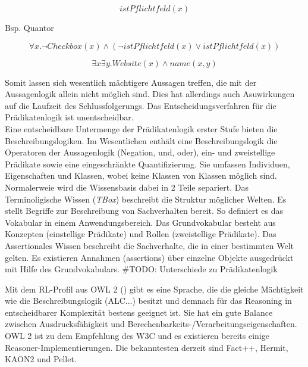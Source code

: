 \documentclass[runningheads,a4paper]{llncs}
\begin{document}
\begin{equation}
istPflichtfeld(x)
\end{equation}

Bsp. Quantor

\begin{equation}
\forall x. \neg Checkbox(x) \land (\neg istPflichtfeld(x) \lor istPflichtfeld(x))
\end{equation}

\begin{equation}
\exists x\exists y. Website(x) \land name(x, y)
\end{equation}

Somit lassen sich wesentlich mächtigere Aussagen treffen, die mit der Aussagenlogik allein nicht möglich sind.
Dies hat allerdings auch Asuwirkungen auf die Laufzeit des Schlussfolgerungs.
Das Entscheidungsverfahren für die Prädikatenlogik ist unentscheidbar. 
\\

Eine entscheidbare Untermenge der Prädikatenlogik erster Stufe bieten die Beschreibungslogiken.
Im Wesentlichen enthält eine Beschreibungslogik die Operatoren der Aussagenlogik (Negation, und, oder), ein- und zweistellige Prädikate sowie eine eingeschränkte Quantifizierung.
Sie umfassen Individuen, Eigenschaften und Klassen, wobei keine Klassen von Klassen möglich sind.
Normalerweie wird die Wissensbasis dabei in 2 Teile separiert. 
Das Terminoligische Wissen (\textit{TBox}) beschreibt die Struktur möglicher Welten. 
Es stellt Begriffe zur Beschreibung von Sachverhalten bereit. 
So definiert es das Vokabular in einem Anwendungsbereich. 
Das Grundvokabular besteht aus Konzepten (einstellige Prädikate) und Rollen (zweistellige Prädikate). 
Das Assertionales Wissen beschreibt die Sachverhalte, die in einer bestimmten Welt gelten. 
Es existieren Annahmen (assertions) über einzelne Objekte ausgedrückt mit
Hilfe des Grundvokabulars.
\#TODO: Unterschiede zu Prädikatenlogik

Mit dem RL-Profil aus OWL 2 (\cite{owl2rl}) gibt es eine Sprache, die die gleiche Mächtigkeit wie die Beschreibungslogik (ALC...) besitzt und demnach für das Reasoning in entscheidbarer Komplexität bestens geeignet ist.
Sie hat ein gute Balance zwischen Ausdrucksfähigkeit und Berechenbarkeits-/Verarbeitungseigenschaften.
OWL 2 ist zu dem Empfehlung des W3C und es existieren bereits einige Reasoner-Implementierungen. 
Die bekanntesten derzeit sind Fact++, Hermit, KAON2 und Pellet.
\end{document}
